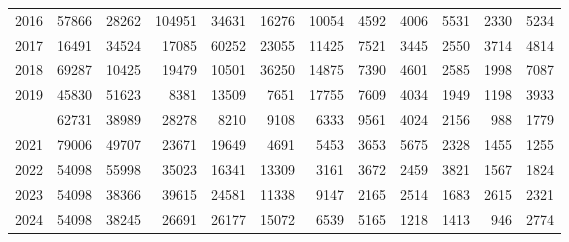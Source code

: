 \documentclass[
]{article}
\begin{document}
\begin{longtable}[t]{lrrrrrrrrrrr}
2016 & 57866 & 28262 & 104951 & 34631 & 16276 & 10054 & 4592 & 4006 & 5531 & 2330 & 5234\\
2017 & 16491 & 34524 & 17085 & 60252 & 23055 & 11425 & 7521 & 3445 & 2550 & 3714 & 4814\\
2018 & 69287 & 10425 & 19479 & 10501 & 36250 & 14875 & 7390 & 4601 & 2585 & 1998 & 7087\\
2019 & 45830 & 51623 & 8381 & 13509 & 7651 & 17755 & 7609 & 4034 & 1949 & 1198 & 3933\\
\addlinespace
2020 & 62731 & 38989 & 28278 & 8210 & 9108 & 6333 & 9561 & 4024 & 2156 & 988 & 1779\\
2021 & 79006 & 49707 & 23671 & 19649 & 4691 & 5453 & 3653 & 5675 & 2328 & 1455 & 1255\\
2022 & 54098 & 55998 & 35023 & 16341 & 13309 & 3161 & 3672 & 2459 & 3821 & 1567 & 1824\\
2023 & 54098 & 38366 & 39615 & 24581 & 11338 & 9147 & 2165 & 2514 & 1683 & 2615 & 2321\\
2024 & 54098 & 38245 & 26691 & 26177 & 15072 & 6539 & 5165 & 1218 & 1413 & 946 & 2774\\*
\end{longtable}
\end{document}
